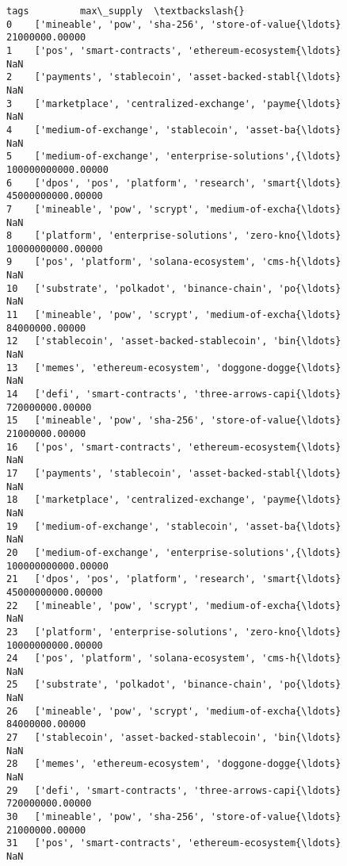 \documentclass[11pt]{article}
\begin{document}
\begin{tcolorbox}[breakable, size=fbox, boxrule=.5pt, pad at break*=1mm, opacityfill=0]
\begin{Verbatim}[commandchars=\\\{\}]
                                                  tags         max\_supply  \textbackslash{}
0    ['mineable', 'pow', 'sha-256', 'store-of-value{\ldots}     21000000.00000
1    ['pos', 'smart-contracts', 'ethereum-ecosystem{\ldots}                NaN
2    ['payments', 'stablecoin', 'asset-backed-stabl{\ldots}                NaN
3    ['marketplace', 'centralized-exchange', 'payme{\ldots}                NaN
4    ['medium-of-exchange', 'stablecoin', 'asset-ba{\ldots}                NaN
5    ['medium-of-exchange', 'enterprise-solutions',{\ldots} 100000000000.00000
6    ['dpos', 'pos', 'platform', 'research', 'smart{\ldots}  45000000000.00000
7    ['mineable', 'pow', 'scrypt', 'medium-of-excha{\ldots}                NaN
8    ['platform', 'enterprise-solutions', 'zero-kno{\ldots}  10000000000.00000
9    ['pos', 'platform', 'solana-ecosystem', 'cms-h{\ldots}                NaN
10   ['substrate', 'polkadot', 'binance-chain', 'po{\ldots}                NaN
11   ['mineable', 'pow', 'scrypt', 'medium-of-excha{\ldots}     84000000.00000
12   ['stablecoin', 'asset-backed-stablecoin', 'bin{\ldots}                NaN
13   ['memes', 'ethereum-ecosystem', 'doggone-dogge{\ldots}                NaN
14   ['defi', 'smart-contracts', 'three-arrows-capi{\ldots}    720000000.00000
15   ['mineable', 'pow', 'sha-256', 'store-of-value{\ldots}     21000000.00000
16   ['pos', 'smart-contracts', 'ethereum-ecosystem{\ldots}                NaN
17   ['payments', 'stablecoin', 'asset-backed-stabl{\ldots}                NaN
18   ['marketplace', 'centralized-exchange', 'payme{\ldots}                NaN
19   ['medium-of-exchange', 'stablecoin', 'asset-ba{\ldots}                NaN
20   ['medium-of-exchange', 'enterprise-solutions',{\ldots} 100000000000.00000
21   ['dpos', 'pos', 'platform', 'research', 'smart{\ldots}  45000000000.00000
22   ['mineable', 'pow', 'scrypt', 'medium-of-excha{\ldots}                NaN
23   ['platform', 'enterprise-solutions', 'zero-kno{\ldots}  10000000000.00000
24   ['pos', 'platform', 'solana-ecosystem', 'cms-h{\ldots}                NaN
25   ['substrate', 'polkadot', 'binance-chain', 'po{\ldots}                NaN
26   ['mineable', 'pow', 'scrypt', 'medium-of-excha{\ldots}     84000000.00000
27   ['stablecoin', 'asset-backed-stablecoin', 'bin{\ldots}                NaN
28   ['memes', 'ethereum-ecosystem', 'doggone-dogge{\ldots}                NaN
29   ['defi', 'smart-contracts', 'three-arrows-capi{\ldots}    720000000.00000
30   ['mineable', 'pow', 'sha-256', 'store-of-value{\ldots}     21000000.00000
31   ['pos', 'smart-contracts', 'ethereum-ecosystem{\ldots}                NaN

\end{Verbatim}
\end{tcolorbox}
\end{document}
